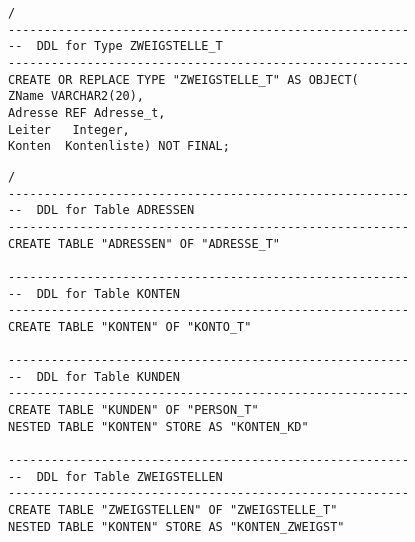 \documentclass{scrartcl}
\begin{document}
\begin{lstlisting}
/
--------------------------------------------------------
--  DDL for Type ZWEIGSTELLE_T
--------------------------------------------------------
CREATE OR REPLACE TYPE "ZWEIGSTELLE_T" AS OBJECT(
ZName VARCHAR2(20),
Adresse REF Adresse_t,
Leiter   Integer,
Konten  Kontenliste) NOT FINAL;
\end{lstlisting}
\begin{lstlisting}
/
--------------------------------------------------------
--  DDL for Table ADRESSEN
--------------------------------------------------------
CREATE TABLE "ADRESSEN" OF "ADRESSE_T" 

--------------------------------------------------------
--  DDL for Table KONTEN
--------------------------------------------------------
CREATE TABLE "KONTEN" OF "KONTO_T" 

--------------------------------------------------------
--  DDL for Table KUNDEN
--------------------------------------------------------
CREATE TABLE "KUNDEN" OF "PERSON_T" 
NESTED TABLE "KONTEN" STORE AS "KONTEN_KD"

--------------------------------------------------------
--  DDL for Table ZWEIGSTELLEN
--------------------------------------------------------
CREATE TABLE "ZWEIGSTELLEN" OF "ZWEIGSTELLE_T" 
NESTED TABLE "KONTEN" STORE AS "KONTEN_ZWEIGST"
\end{lstlisting}
\end{document}
